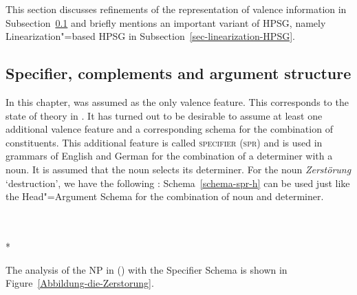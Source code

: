 This section discusses refinements of the representation of valence information in
Subsection~\ref{Abschnitt-Arg-St} and briefly mentions an important variant of HPSG, namely
Linearization"=based HPSG in Subsection~\ref{sec-linearization-HPSG}.

\subsection{Specifier, complements and argument structure}
\label{Abschnitt-Arg-St}
\label{Abschnitt-Spr}

In this chapter, \subcat was assumed as the only valence feature. This corresponds to the state of theory in
. It has turned out to be desirable to assume at least one additional valence feature and a
corresponding schema for the combination of constituents. This additional feature is called \textsc{specifier}
(\textsc{spr}) and is used in grammars of English \citep[Chapter~9]{ps2} and German
\citep[Section~9.3]{MuellerLehrbuch1} for the combination of a determiner with a noun. It is assumed that the noun selects
its determiner. For the noun \emph{Zerstörung} `destruction', we have the following \catv:
\ea
{}
\z
Schema~\ref{schema-spr-h} can be used just like the Head"=Argument Schema for the combination
of noun and determiner.
\begin{schema}
\label{schema-spr-h}
~\\
 \impl\\*
\end{schema}
The analysis of the NP in () with the Specifier Schema is shown in 
Figure~\vref{Abbildung-die-Zerstorung}.
